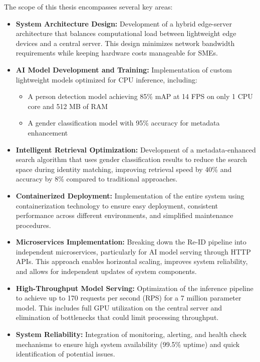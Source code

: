 \documentclass[../main.tex]{subfiles}
\begin{document}
The scope of this thesis encompasses several key areas:

\begin{itemize}
    \item \textbf{System Architecture Design:} Development of a hybrid edge-server architecture that balances computational load between lightweight edge devices and a central server. This design minimizes network bandwidth requirements while keeping hardware costs manageable for SMEs.
    
    \item \textbf{AI Model Development and Training:} Implementation of custom lightweight models optimized for CPU inference, including:
    \begin{itemize}
        \item A person detection model achieving 85\% mAP at 14 FPS on only 1 CPU core and 512 MB of RAM
        \item A gender classification model with 95\% accuracy for metadata enhancement
    \end{itemize}
    
    \item \textbf{Intelligent Retrieval Optimization:} Development of a metadata-enhanced search algorithm that uses gender classification results to reduce the search space during identity matching, improving retrieval speed by 40\% and accuracy by 8\% compared to traditional approaches.
    
    \item \textbf{Containerized Deployment:} Implementation of the entire system using \\ containerization technology to ensure easy deployment, consistent performance across different environments, and simplified maintenance procedures.
    
    \item \textbf{Microservices Implementation:} Breaking down the Re-ID pipeline into \\ independent microservices, particularly for AI model serving through HTTP APIs. This approach enables horizontal scaling, improves system reliability, and allows for independent updates of system components.

    \item \textbf{High-Throughput Model Serving:} Optimization of the inference pipeline to achieve up to 170 requests per second (RPS) for a 7 million parameter model. This includes full GPU utilization on the central server and elimination of bottlenecks that could limit processing throughput.
    
    \item \textbf{System Reliability:} Integration of monitoring, alerting, and health check mechanisms to ensure high system availability (99.5\% uptime) and quick identification of potential issues.
\end{itemize}
\end{document}
